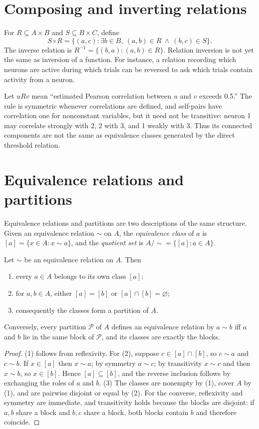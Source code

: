 \section{Composing and inverting relations}
For $R\subseteq A\times B$ and $S\subseteq B\times C$, define
\[S\circ R=\{(a,c):\exists b\in B,\ (a,b)\in R\ \land\ (b,c)\in S\}.\]
The inverse relation is $R^{-1}=\{(b,a):(a,b)\in R\}$. Relation inversion is not yet the same as inversion of a function. For instance, a relation recording which neurons are active during which trials can be reversed to ask which trials contain activity from a neuron.

\begin{workedexample}
Let $uRv$ mean ``estimated Pearson correlation between $u$ and $v$ exceeds 0.5.'' The rule is symmetric whenever correlations are defined, and self-pairs have correlation one for nonconstant variables, but it need not be transitive: neuron 1 may correlate strongly with 2, 2 with 3, and 1 weakly with 3. Thus its connected components are not the same as equivalence classes generated by the direct threshold relation.
\end{workedexample}
\section{Equivalence relations and partitions}
Equivalence relations and partitions are two descriptions of the same structure. Given an equivalence relation $\sim$ on $A$, the \emph{equivalence class} of $a$ is $[a]=\{x\in A:x\sim a\}$, and the \emph{quotient set} is $A/{\sim}=\{[a]:a\in A\}$.

\begin{theorem}
Let $\sim$ be an equivalence relation on $A$. Then
\begin{enumerate}[leftmargin=2em]
\item every $a\in A$ belongs to its own class $[a]$;
\item for $a,b\in A$, either $[a]=[b]$ or $[a]\cap[b]=\varnothing$;
\item consequently the classes form a partition of $A$.
\end{enumerate}
Conversely, every partition $\mathcal P$ of $A$ defines an equivalence relation by $a\sim b$ iff $a$ and $b$ lie in the same block of $\mathcal P$, and its classes are exactly the blocks.
\end{theorem}
\begin{proof}
(1) follows from reflexivity. For (2), suppose $c\in[a]\cap[b]$, so $c\sim a$ and $c\sim b$. If $x\in[a]$ then $x\sim a$; by symmetry $a\sim c$; by transitivity $x\sim c$ and then $x\sim b$, so $x\in[b]$. Hence $[a]\subseteq[b]$, and the reverse inclusion follows by exchanging the roles of $a$ and $b$. (3) The classes are nonempty by (1), cover $A$ by (1), and are pairwise disjoint or equal by (2). For the converse, reflexivity and symmetry are immediate, and transitivity holds because the blocks are disjoint: if $a,b$ share a block and $b,c$ share a block, both blocks contain $b$ and therefore coincide.
\end{proof}

